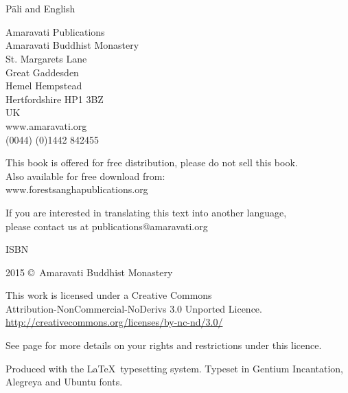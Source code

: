 
\thispagestyle{empty}

{\centering\small
\setlength{\parskip}{15pt}

{\normalsize
\thetitle\\
\thesubtitle\\
Pāli and English}

Amaravati Publications\\
Amaravati Buddhist Monastery\\
St. Margarets Lane\\
Great Gaddesden\\
Hemel Hempstead\\
Hertfordshire HP1 3BZ\\
UK\\
www.amaravati.org\\
(0044) (0)1442 842455

This book is offered for free distribution, please do not sell this book.\\
Also available for free download from:\\
www.forestsanghapublications.org

If you are interested in translating this text into another language,\\
please contact us at publications@amaravati.org

ISBN \theISBN

2015 \copyright\ Amaravati Buddhist Monastery

\vfill

This work is licensed under a Creative Commons\\
Attribution-NonCommercial-NoDerivs 3.0 Unported Licence.\\
\href{http://creativecommons.org/licenses/by-nc-nd/3.0/}{http://creativecommons.org/licenses/by-nc-nd/3.0/}

See page \pageref{copyright-details} for more details on your rights and restrictions under this licence.

Produced with the \LaTeX\ typesetting system. Typeset in Gentium Incantation,\\
Alegreya and Ubuntu fonts.

\theEditionInfo


}

